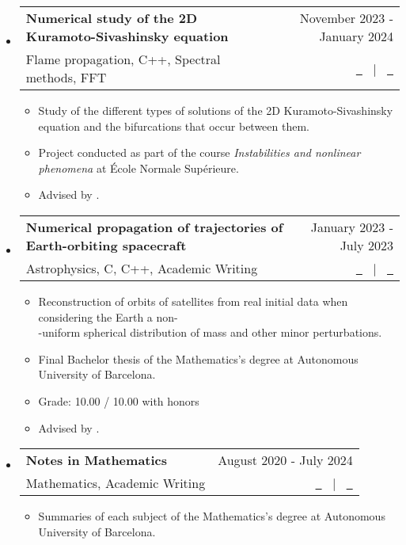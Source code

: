 \documentclass[a4paper,11pt]{article}
\makeatletter
\newcommand{\resumeItemListEnd}{\end{itemize}}
\newcommand{\resumeQuadHeading}[4]{
  \item
  \begin{tabular*}{0.96\textwidth}[t]{l@{\extracolsep{\fill}}r}
    \textbf{#1} & \small #2 \\
    \small#3 & \small #4 \\
  \end{tabular*}
}
\newcommand{\resumeHeadingListStart}{
  \begin{itemize}[leftmargin=0.15in, label={}]
}
\newcommand{\resumeHeadingListEnd}{\end{itemize}}
\makeatother
\begin{document}
\resumeHeadingListStart{}
\resumeQuadHeading{Numerical study of the 2D Kuramoto-Sivashinsky equation}{November 2023 - January 2024}{Flame propagation, C++, Spectral methods, FFT}{\href{https://github.com/victorballester7/2D-kuramoto-sivashinsky/releases/latest/download/main.pdf}{\faFileTextO \ \graydotuline{Report}} \ $|$ \ \href{https://github.com/victorballester7/2D-kuramoto-sivashinsky}{\faGithub \ \graydotuline{Code}}}
\begin{itemize}[leftmargin=3em, itemsep=0.1em, topsep=2pt]
  \item \small Study of the different types of solutions of the 2D Kuramoto-Sivashinsky equation and the bifurcations that occur between them.
  \item \small Project conducted as part of the course \textit{Instabilities and nonlinear phenomena} at École Normale Supérieure.
  \item \small Advised by \href{https://blog.espci.fr/laurette/}{}.
\end{itemize}
\resumeHeadingListEnd{}

\resumeHeadingListStart{}
\resumeQuadHeading{Numerical propagation of trajectories of Earth-orbiting spacecraft}{January 2023 - July 2023}{Astrophysics, C, C++, Academic Writing}{\href{https://github.com/victorballester7/final-bachelor-thesis/releases/latest/download/main.pdf}{\faFileTextO \ \graydotuline{Report}} \ $|$ \ \href{https://github.com/victorballester7/final-bachelor-thesis}{\faGithub \ \graydotuline{Code}}}
\begin{itemize}[leftmargin=3em, itemsep=0.1em, topsep=2pt]
  \item \small Reconstruction of orbits of satellites from real initial data when considering the Earth a non-\\-uniform spherical distribution of mass and other minor perturbations.
  \item \small Final Bachelor thesis of the Mathematics's degree at Autonomous University of Barcelona.
  \item Grade: 10.00 / 10.00 with honors
  \item \small Advised by \href{http://www.gsd.uab.es/people?controller=member&view=member&id=9&slug=josep-maria}{}.
\end{itemize}
\resumeHeadingListEnd{}


\resumeHeadingListStart{}
\resumeQuadHeading{Notes in Mathematics}{August 2020 - July 2024}{Mathematics, Academic Writing}{\href{https://victorballester7.github.io/complete-summaries/}{\faGlobe \ \graydotuline{Website}} \ $|$ \ \href{https://github.com/victorballester7/complete-summaries}{\faGithub \ \graydotuline{Code}}}
\begin{itemize}[leftmargin=3em, itemsep=0.1em, topsep=2pt]
  \item \small Summaries of each subject of the Mathematics's degree at Autonomous University of Barcelona.
\end{itemize}
\resumeItemListEnd{}
\end{document}
